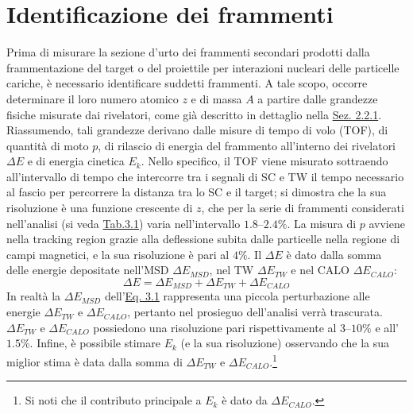\documentclass[12pt,a4paper,twoside]{report}
\begin{document}
	\section{Identificazione dei frammenti}\label{sec:fragment_identification}
	Prima di misurare la sezione d'urto dei frammenti secondari prodotti dalla frammentazione del target o del proiettile per interazioni nucleari delle particelle cariche, è necessario identificare suddetti frammenti. A tale scopo, occorre determinare il loro numero atomico $z$ e di massa $A$ a partire dalle grandezze fisiche misurate dai rivelatori, come già descritto in dettaglio nella \hyperref[sec:setupElettronico]{Sez. 2.2.1}. Riassumendo, tali grandezze derivano dalle misure di tempo di volo (TOF), di quantità di moto $p$, di rilascio di energia del frammento all'interno dei rivelatori $\Delta E$ e di energia cinetica $E_k$. Nello specifico, il TOF viene misurato sottraendo all'intervallo di tempo che intercorre tra i segnali di SC e TW il tempo necessario al fascio per percorrere la distanza tra lo SC e il target; si dimostra che la sua risoluzione è una funzione crescente di $z$, che per la serie di frammenti considerati nell'analisi (si veda \hyperref[tab:fragments]{Tab.3.1}) varia nell'intervallo $1.8$--$2.4\%$. La misura di $p$ avviene nella tracking region grazie alla deflessione subita dalle particelle nella regione di campi magnetici, e la sua risoluzione è pari al $4\%$. Il $\Delta E$ è dato dalla somma delle energie depositate nell'MSD $\Delta E_{MSD}$, nel TW $\Delta E_{TW}$ e nel CALO $\Delta E_{CALO}$:
	\begin{equation}
		\Delta E=\Delta E_{MSD}+\Delta E_{TW}+\Delta E_{CALO}
		\label{eq:deposited_energy}
	\end{equation}
	In realtà la $\Delta E_{MSD}$ dell'\hyperref[eq:deposited_energy]{Eq. 3.1} rappresenta una piccola perturbazione alle energie $\Delta E_{TW}$ e $\Delta E_{CALO}$, pertanto nel prosieguo dell'analisi verrà trascurata. $\Delta E_{TW}$ e $\Delta E_{CALO}$ possiedono una risoluzione pari rispettivamente al $3$--$10\%$ e all'$1.5\%$. Infine, è possibile stimare $E_k$ (e la sua risoluzione) osservando che la sua miglior stima è data dalla somma di $\Delta E_{TW}$ e $\Delta E_{CALO}$.\footnote{Si noti che il contributo principale a $E_k$ è dato da $\Delta E_{CALO}$.}
	
\end{document}
